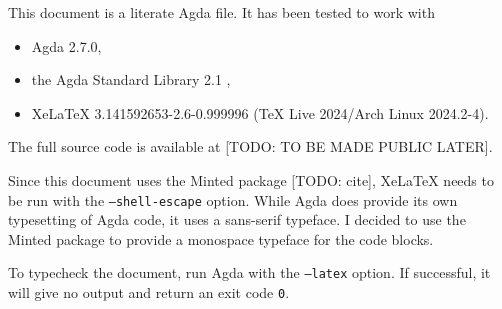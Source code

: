 \documentclass[logo,bsc,singlespacing,parskip,online]{infthesis}
\begin{document}
This document is a literate Agda file. It has been tested to work with
\begin{itemize}
  \item Agda 2.7.0,
  \item the Agda Standard Library 2.1 \citep{the_agda_community_agda_2024},
  \item XeLaTeX 3.141592653-2.6-0.999996 (TeX Live 2024/Arch Linux 2024.2-4).
\end{itemize}

The full source code is available at [TODO: TO BE MADE PUBLIC LATER].

Since this document uses the Minted package [TODO: cite], XeLaTeX needs to be run with the
\texttt{--shell-escape} option. While Agda does provide its own typesetting of Agda code, it uses a
sans-serif typeface. I decided to use the Minted package to provide a monospace typeface for the
code blocks.

To typecheck the document, run Agda with the \texttt{--latex} option. If successful, it will give no
output and return an exit code \texttt{0}.
\end{document}
